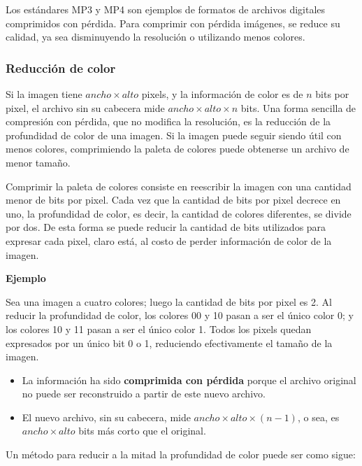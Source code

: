 \documentclass[spanish,A4,]{article}
\begin{document}
Los estándares MP3 y MP4 son ejemplos de formatos de archivos digitales
comprimidos con pérdida. Para comprimir con pérdida imágenes, se reduce
su calidad, ya sea disminuyendo la resolución o utilizando menos
colores.

\subsubsection{Reducción de color}\label{reducciuxf3n-de-color}

Si la imagen tiene $ancho \times alto$ pixels, y la información de color
es de $n$ bits por pixel, el archivo sin su cabecera mide
$ancho \times alto \times n$ bits. Una forma sencilla de compresión con
pérdida, que no modifica la resolución, es la reducción de la
profundidad de color de una imagen. Si la imagen puede seguir siendo
útil con menos colores, comprimiendo la paleta de colores puede
obtenerse un archivo de menor tamaño.

Comprimir la paleta de colores consiste en reescribir la imagen con una
cantidad menor de bits por pixel. Cada vez que la cantidad de bits por
pixel decrece en uno, la profundidad de color, es decir, la cantidad de
colores diferentes, se divide por dos. De esta forma se puede reducir la
cantidad de bits utilizados para expresar cada pixel, claro está, al
costo de perder información de color de la imagen.

\textbf{Ejemplo}

Sea una imagen a cuatro colores; luego la cantidad de bits por pixel es
2. Al reducir la profundidad de color, los colores 00 y 10 pasan a ser
el único color 0; y los colores 10 y 11 pasan a ser el único color 1.
Todos los pixels quedan expresados por un único bit 0 o 1, reduciendo
efectivamente el tamaño de la imagen.

\begin{itemize}
\itemsep1pt\parskip0pt
\item
  La información ha sido \textbf{comprimida con pérdida} porque el
  archivo original no puede ser reconstruido a partir de este nuevo
  archivo.
\item
  El nuevo archivo, sin su cabecera, mide
  $ancho \times alto \times (n - 1)$, o sea, es $ancho \times alto$ bits
  más corto que el original.
\end{itemize}

Un método para reducir a la mitad la profundidad de color puede ser como
sigue:
\end{document}
